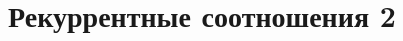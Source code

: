 \documentclass[14pt]{article}
\begin{document}
\title{Рекуррентные соотношения 2}

\maketitle


\end{document}
